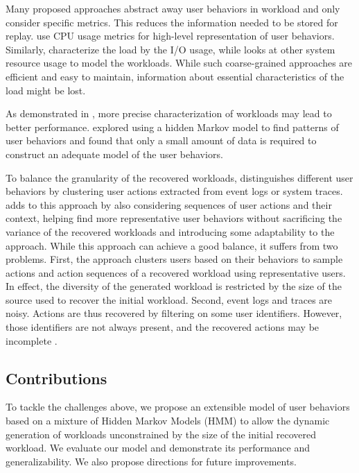 Many proposed approaches abstract away user behaviors in workload and only consider specific metrics. This reduces the information needed to be stored for replay. \cite{Shang2015-gj, Cohen2005-mn} use CPU usage metrics for high-level representation of user behaviors. Similarly, \cite{Haghdoost2017-bc, Yadwadkar2010-ml, Busch2015-yo, Seo2014-xv} characterize the load by the I/O usage, while \cite{Cortez2017-nc} looks at other system resource usage to model the workloads. While such coarse-grained approaches are efficient and easy to maintain, information about essential characteristics of the load might be lost.

As demonstrated in \cite{Cohen2005-mn}, more precise characterization of workloads may lead to better performance. \cite{Yadwadkar2010-ml} explored using a hidden Markov model to find patterns of user behaviors and found that only a small amount of data is required to construct an adequate model of the user behaviors.

To balance the granularity of the recovered workloads, \cite{Syer2017-ek, Vogele2018-zz, Summers2016-jj, Xi2011-ki, Hassan2008-nj} distinguishes different user behaviors by clustering user actions extracted from event logs or system traces. \cite{Chen2019-fu} adds to this approach by also considering sequences of user actions and their context, helping find more representative user behaviors without sacrificing the variance of the recovered workloads and introducing some adaptability to the approach. While this approach can achieve a good balance, it suffers from two problems. First, the approach clusters users based on their behaviors to sample actions and action sequences of a recovered workload using representative users. In effect, the diversity of the generated workload is restricted by the size of the source used to recover the initial workload. Second, event logs and traces are noisy. Actions are thus recovered by filtering on some user identifiers. However, those identifiers are not always present, and the recovered actions may be incomplete \cite{Zhao2023-nh}.

\subsection{Contributions}

To tackle the challenges above, we propose an extensible model of user behaviors based on a mixture of Hidden Markov Models (HMM) to allow the dynamic generation of workloads unconstrained by the size of the initial recovered workload. We evaluate our model and demonstrate its performance and generalizability. We also propose directions for future improvements.

